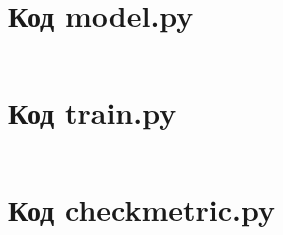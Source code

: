 \documentclass[bachelor, och, coursework]{SCWorks}
\begin{document}
    \section{Код model.py}
    \inputminted[fontsize=\footnotesize]{text}{model-ver-2/model.py}

    \section{Код train.py}
    \inputminted[fontsize=\footnotesize]{text}{model-ver-2/train.py}

    \section{Код checkmetric.py}
    \inputminted[fontsize=\footnotesize]{text}{model-ver-2/checkmetric.py}
\end{document}
